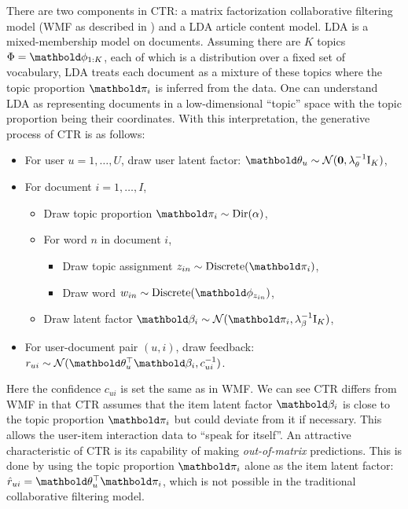 There are two components in \gls{CTR}: a matrix factorization collaborative filtering model (\gls{WMF} as described in ) and a \gls{LDA} article content model. \gls{LDA} \citep{blei2003latent} is a mixed-membership model on documents. Assuming there are $K$ topics $\Phi = \mb\phi_{1:K}$, each of which is a distribution over a fixed set of vocabulary, \gls{LDA} treats each document as a mixture of these topics where the topic proportion $\mb\pi_i$ is inferred from the data.
One can understand \gls{LDA} as representing documents in a low-dimensional ``topic'' space with the topic proportion being their coordinates. With this interpretation, the generative process of \gls{CTR} is as follows: 
\begin{itemize}
\item For user $u = 1, \dots, U$, draw user latent factor: $\mb\theta_u \sim \cN(\bzero, \lambda_\theta^{-1} \mathrm{I}_K)$,
\item For document $i = 1, \dots, I$, 
\begin{itemize}
\item Draw topic proportion $\mb\pi_i \sim \dir(\alpha)$,
\item For word $n$ in document $i$, 
\begin{itemize}
\item 
Draw topic assignment $z_{in} \sim \discrete(\mb\pi_i)$,
\item 
Draw word $w_{in} \sim \discrete(\mb\phi_{z_{in}})$,
\end{itemize}
\item Draw latent factor $\mb\beta_i \sim \cN(\mb\pi_i, \lambda_\beta^{-1} \mathrm{I}_K)$,
 \end{itemize}
\item For user-document pair $(u, i)$, draw feedback: $r_{ui} \sim \cN(\mb\theta_u^\top\mb\beta_i, c_{ui}^{-1})$.
\end{itemize}

Here the confidence $c_{ui}$ is set the same as in \gls{WMF}. We can see \gls{CTR} differs from \gls{WMF} in that \gls{CTR} assumes that the item latent factor $\mb\beta_i$ is close to the topic proportion $\mb\pi_i$ but could deviate from it if necessary. This allows the user-item interaction data to ``speak for itself''. An attractive characteristic of \gls{CTR} is its capability of making \emph{out-of-matrix} predictions.  This is done by using the topic proportion $\mb\pi_i$ alone as the item latent factor: $\hat{r}_{ui} = \mb\theta_u^\top \mb\pi_i$, which is not possible in the traditional collaborative filtering model. 


